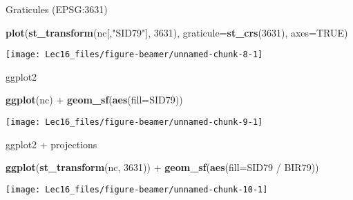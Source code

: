 \documentclass[11pt,ignorenonframetext,]{beamer}
\newenvironment{Shaded}{}{}
\newcommand{\DataTypeTok}[1]{\textcolor[rgb]{0.56,0.13,0.00}{#1}}
\newcommand{\DecValTok}[1]{\textcolor[rgb]{0.25,0.63,0.44}{#1}}
\newcommand{\KeywordTok}[1]{\textcolor[rgb]{0.00,0.44,0.13}{\textbf{#1}}}
\newcommand{\NormalTok}[1]{#1}
\newcommand{\OperatorTok}[1]{\textcolor[rgb]{0.40,0.40,0.40}{#1}}
\newcommand{\OtherTok}[1]{\textcolor[rgb]{0.00,0.44,0.13}{#1}}
\newcommand{\StringTok}[1]{\textcolor[rgb]{0.25,0.44,0.63}{#1}}
\let\oldShaded\Shaded
\let\endoldShaded\endShaded
\renewenvironment{Shaded}{\footnotesize\begin{spacing}{0.9}\oldShaded}{\endoldShaded\end{spacing}}
\let\oldverbatim\verbatim
\let\endoldverbatim\endverbatim
\newcommand{\scriptoutput}{
  \renewenvironment{Shaded}{\scriptsize\begin{spacing}{0.9}\oldShaded}{\endoldShaded\end{spacing}}
  \renewenvironment{verbatim}{\scriptsize\begin{spacing}{0.9}\oldverbatim}{\endoldverbatim\end{spacing}}
}
\begin{document}
\begin{frame}[fragile,t]{Graticules (EPSG:3631)}
\protect\hypertarget{graticules-epsg3631-2}{}

\scriptoutput

\begin{Shaded}
\begin{Highlighting}[]
\KeywordTok{plot}\NormalTok{(}\KeywordTok{st_transform}\NormalTok{(nc[,}\StringTok{"SID79"}\NormalTok{], }\DecValTok{3631}\NormalTok{), }\DataTypeTok{graticule=}\KeywordTok{st_crs}\NormalTok{(}\DecValTok{3631}\NormalTok{), }\DataTypeTok{axes=}\OtherTok{TRUE}\NormalTok{)}
\end{Highlighting}
\end{Shaded}

\begin{center}\texttt{[image: Lec16\_files/figure-beamer/unnamed-chunk-8-1]} \end{center}

\end{frame}

\begin{frame}[fragile,t]{ggplot2}
\protect\hypertarget{ggplot2}{}

\scriptoutput

\begin{Shaded}
\begin{Highlighting}[]
\KeywordTok{ggplot}\NormalTok{(nc) }\OperatorTok{+}\StringTok{ }
\StringTok{  }\KeywordTok{geom_sf}\NormalTok{(}\KeywordTok{aes}\NormalTok{(}\DataTypeTok{fill=}\NormalTok{SID79))}
\end{Highlighting}
\end{Shaded}

\begin{center}\texttt{[image: Lec16\_files/figure-beamer/unnamed-chunk-9-1]} \end{center}

\end{frame}

\begin{frame}[fragile,t]{ggplot2 + projections}
\protect\hypertarget{ggplot2-projections}{}

\scriptoutput

\begin{Shaded}
\begin{Highlighting}[]
\KeywordTok{ggplot}\NormalTok{(}\KeywordTok{st_transform}\NormalTok{(nc, }\DecValTok{3631}\NormalTok{)) }\OperatorTok{+}\StringTok{ }
\StringTok{  }\KeywordTok{geom_sf}\NormalTok{(}\KeywordTok{aes}\NormalTok{(}\DataTypeTok{fill=}\NormalTok{SID79 }\OperatorTok{/}\StringTok{ }\NormalTok{BIR79))}
\end{Highlighting}
\end{Shaded}

\begin{center}\texttt{[image: Lec16\_files/figure-beamer/unnamed-chunk-10-1]} \end{center}

\end{frame}
\end{document}
